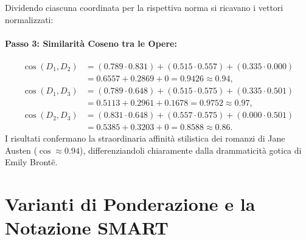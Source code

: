 Dividendo ciascuna coordinata per la rispettiva norma si ricavano i vettori normalizzati:

\begin{table}[H]
\centering
\small
{}
\caption{Vettori di peso normalizzati con norma euclidea unitaria ($\|\vec{v}_{\text{norm}}\|_2 = 1$).}
\label{tab:novels-normalized}
\end{table}

\paragraph{Passo 3: Similarit\`a Coseno tra le Opere:}
\begin{align}
\cos(D_1, D_2) &= (0.789 \cdot 0.831) + (0.515 \cdot 0.557) + (0.335 \cdot 0.000) \nonumber \\
               &= 0.6557 + 0.2869 + 0 = \mathbf{0.9426} \approx \mathbf{0.94}, \\[0.2cm]
\cos(D_1, D_3) &= (0.789 \cdot 0.648) + (0.515 \cdot 0.575) + (0.335 \cdot 0.501) \nonumber \\
               &= 0.5113 + 0.2961 + 0.1678 = \mathbf{0.9752} \approx \mathbf{0.97}, \\[0.2cm]
\cos(D_2, D_3) &= (0.831 \cdot 0.648) + (0.557 \cdot 0.575) + (0.000 \cdot 0.501) \nonumber \\
               &= 0.5385 + 0.3203 + 0 = \mathbf{0.8588} \approx \mathbf{0.86}.
\end{align}
I risultati confermano la straordinaria affinit\`a stilistica dei romanzi di Jane Austen ($\cos \approx 0.94$), differenziandoli chiaramente dalla drammaticit\`a gotica di Emily Bront\"e.

\FloatBarrier
\section{Varianti di Ponderazione e la Notazione SMART}
\label{sec:notazione-smart}


